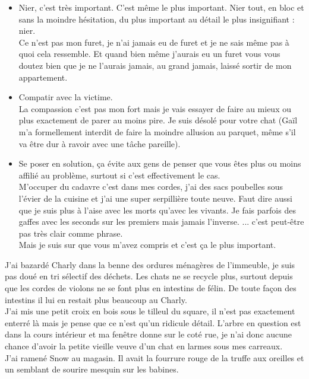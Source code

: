 \begin{itemize}
  \item Nier, c'est très important. C'est même le plus important. Nier tout, en bloc et sans la moindre hésitation, du plus important au détail le plus insignifiant : nier. \\
  Ce n'est pas mon furet, je n'ai jamais eu de furet et je ne sais même pas à quoi cela ressemble. Et quand bien même j'aurais eu un furet vous vous doutez bien que je ne l'aurais jamais, au grand jamais, laissé sortir de mon appartement.
  \item Compatir avec la victime. \\
  La compassion c'est pas mon fort mais je vais essayer de faire au mieux ou plus exactement de parer au moins pire. Je suis désolé pour votre chat (Gaïl m'a formellement interdit de faire la moindre allusion au parquet, même s'il va être dur à ravoir avec une tâche pareille).\\
  \item Se poser en solution, ça évite aux gens de penser que vous êtes plus ou moins affilié au problème, surtout si c'est effectivement le cas. \\
  M'occuper du cadavre c'est dans mes cordes, j'ai des sacs poubelles sous l'évier de la cuisine et j'ai une super serpillière toute neuve. Faut dire aussi que je suis plus à l'aise avec les morts qu'avec les vivants. Je fais parfois des gaffes avec les seconds sur les premiers mais jamais l'inverse. ... c'est peut-être pas très clair comme phrase.\\
  Mais je suis sur que vous m'avez compris et c'est ça le plus important. \\
\end{itemize}

J'ai bazardé Charly dans la benne des ordures ménagères de l'immeuble, je suis pas doué en tri sélectif des déchets. Les chats ne se recycle plus, surtout depuis que les cordes de violons ne se font plus en intestins de félin. De toute façon des intestins il lui en restait plus beaucoup au Charly. \\
J'ai mis une petit croix en bois sous le tilleul du square, il n'est pas exactement enterré là mais je pense que ce n'est qu'un ridicule détail. L'arbre en question est dans la cours intérieur et ma fenêtre donne sur le coté rue, je n'ai donc aucune chance d'avoir la petite vieille veuve d'un chat en larmes sous mes carreaux. \\

J'ai ramené Snow au magasin. Il avait la fourrure rouge de la truffe aux oreilles et un semblant de sourire mesquin sur les babines. \\


